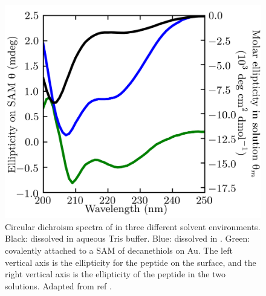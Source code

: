 \begin{figure}  
    \center
    \includegraphics[width=\single]{figures-helix/nachos_cd_spectra.png}
    \caption{
        Circular dichroism spectra of \pep{} in three different solvent environments. 
        Black: \pep{} dissolved in aqueous Tris buffer. 
        Blue: \pep{} dissolved in \tbawat{}. 
        Green: \pep{} covalently attached to a SAM of decanethiols on Au. 
        The left vertical axis is the ellipticity for the peptide on the surface, and the right vertical axis is the ellipticity of the peptide in the two solutions. 
        Adapted from ref .
    }
    \label{fig:helix-cd_spectra}
\end{figure}


